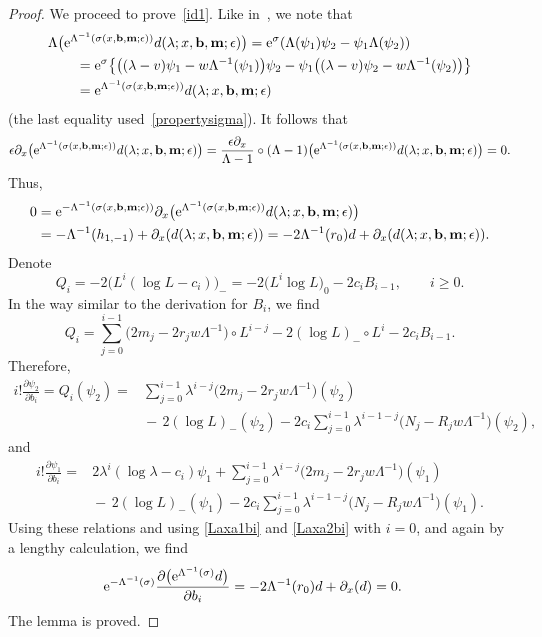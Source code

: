 \documentclass[11pt]{article}
\numberwithin{equation}{section}
\newcommand{\e}{\epsilon}
\newcommand{\p}{\partial}
\newcommand{\nn}{\nonumber}
\numberwithin{equation}{section}
\begin{document}
\begin{proof}
We proceed to prove~\eqref{id1}. Like in~\cite{Y}, we note that
\begin{align*}
&\Lambda \bigl({\rm e}^{\Lambda^{-1}(\sigma(x,{\bf b},{\bf m};\e))}d(\lambda; x,{\bf b}, {\bf m};\e)\bigr)
 = {\rm e}^{\sigma} (\Lambda(\psi_1) \psi_2
- \psi_1 \Lambda( \psi_2) ) \nn\\
&\qquad{} = {\rm e}^{\sigma} \bigl\{ \bigl((\lambda-v) \psi_1 - w \Lambda^{-1}(\psi_1)\bigr) \psi_2 - \psi_1 \bigl((\lambda-v) \psi_2 - w \Lambda^{-1}(\psi_2)\bigr) \bigr\} \nn\\
&\qquad{} = {\rm e}^{\Lambda^{-1}(\sigma(x, {\bf b},{\bf m};\e))}d(\lambda; x,{\bf b}, {\bf m};\e) \nn
\end{align*}
(the last equality used~\eqref{propertysigma}).
It follows that
\[
\e\p_x \bigl({\rm e}^{\Lambda^{-1}(\sigma(x,{\bf b},{\bf m};\e))}d(\lambda; x, {\bf b}, {\bf m};\e)\bigr)
= \frac{\e\p_x}{\Lambda-1} \circ (\Lambda-1) \bigl({\rm e}^{\Lambda^{-1}(\sigma(x, {\bf b},{\bf m};\e))}
d(\lambda; x, {\bf b}, {\bf m};\e)\bigr) = 0.
\]
Thus,
\begin{align}
0 & = {\rm e}^{-\Lambda^{-1}(\sigma(x,{\bf b},{\bf m};\e))} \p_x \bigl({\rm e}^{\Lambda^{-1}(\sigma(x,{\bf b},{\bf m};\e))}d(\lambda; x, {\bf b}, {\bf m};\e)\bigr) \nn\\
& = - \Lambda^{-1}(h_{1,-1}) + \p_x(d(\lambda; x, {\bf b}, {\bf m};\e)) = - 2\Lambda^{-1}(r_0)d + \p_x(d(\lambda; x, {\bf b}, {\bf m};\e))\nn.
\end{align}
Denote
\[
Q_i = -2 \bigl(L^i(\log L-c_i)\bigr)_- = -2 \bigl(L^i \log L\bigr)_0-2c_i B_{i-1}, \qquad i\ge0.
\]
In the way similar to the derivation for $B_i$, we find
\[
Q_i= \sum_{j=0}^{i-1} \bigl(2m_j-2r_jw\Lambda^{-1}\bigr) \circ L^{i-j} - 2 (\log L)_- \circ L^i - 2c_i B_{i-1}.
\]
Therefore,
\begin{align*}%
i! \frac{\p \psi_2}{\p b_i} = Q_i (\psi_2)={}&{}
 \sum_{j=0}^{i-1} \lambda^{i-j} \bigl(2m_j-2r_jw\Lambda^{-1}\bigr) (\psi_2)\\
&{}{-}\, 2 (\log L)_- (\psi_2)
-2c_i\sum_{j=0}^{i-1} \lambda^{i-1-j} \bigl(N_j-R_j w\Lambda^{-1}\bigr) (\psi_2),\nn
\end{align*}
and
\begin{align*}%
i! \frac{\p \psi_1}{\p b_i} %
={}&{}2 \lambda^i(\log\lambda-c_i) \psi_1+ \sum_{j=0}^{i-1} \lambda^{i-j} \bigl(2m_j-2r_jw\Lambda^{-1}\bigr) (\psi_1)\\
&{}{-}\, 2 (\log L)_- (\psi_1)
-2c_i\sum_{j=0}^{i-1} \lambda^{i-1-j} \bigl(N_j-R_j w\Lambda^{-1}\bigr) (\psi_1).\nn
\end{align*}
Using these relations and using \eqref{Laxa1bi} and \eqref{Laxa2bi} with $i=0$, and again by a lengthy calculation, we find
\begin{align}
& {\rm e}^{-\Lambda^{-1}(\sigma)}\frac{\p \bigl({\rm e}^{\Lambda^{-1}(\sigma)}d\bigr)}{\p b_i}
= - 2\Lambda^{-1}(r_0)d + \p_x(d) = 0. \nn
\end{align}
The lemma is proved.
\end{proof}
\end{document}
